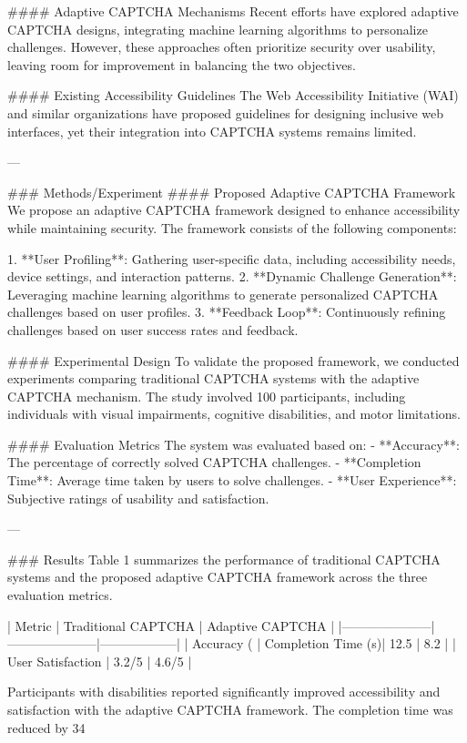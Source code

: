 #### Adaptive CAPTCHA Mechanisms
Recent efforts have explored adaptive CAPTCHA designs, integrating machine learning algorithms to personalize challenges. However, these approaches often prioritize security over usability, leaving room for improvement in balancing the two objectives.

#### Existing Accessibility Guidelines
The Web Accessibility Initiative (WAI) and similar organizations have proposed guidelines for designing inclusive web interfaces, yet their integration into CAPTCHA systems remains limited.

---

### Methods/Experiment
#### Proposed Adaptive CAPTCHA Framework
We propose an adaptive CAPTCHA framework designed to enhance accessibility while maintaining security. The framework consists of the following components:

1. **User Profiling**: Gathering user-specific data, including accessibility needs, device settings, and interaction patterns.
2. **Dynamic Challenge Generation**: Leveraging machine learning algorithms to generate personalized CAPTCHA challenges based on user profiles.
3. **Feedback Loop**: Continuously refining challenges based on user success rates and feedback.

#### Experimental Design
To validate the proposed framework, we conducted experiments comparing traditional CAPTCHA systems with the adaptive CAPTCHA mechanism. The study involved 100 participants, including individuals with visual impairments, cognitive disabilities, and motor limitations.

#### Evaluation Metrics
The system was evaluated based on:
- **Accuracy**: The percentage of correctly solved CAPTCHA challenges.
- **Completion Time**: Average time taken by users to solve challenges.
- **User Experience**: Subjective ratings of usability and satisfaction.

---

### Results
Table 1 summarizes the performance of traditional CAPTCHA systems and the proposed adaptive CAPTCHA framework across the three evaluation metrics.

| Metric             | Traditional CAPTCHA | Adaptive CAPTCHA |
|---------------------|---------------------|------------------|
| Accuracy (%
| Completion Time (s)| 12.5                | 8.2              |
| User Satisfaction  | 3.2/5              | 4.6/5            |

Participants with disabilities reported significantly improved accessibility and satisfaction with the adaptive CAPTCHA framework. The completion time was reduced by 34%

